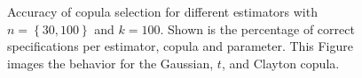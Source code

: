 \begin{figure}[t]
{	}
	\hfill
	\caption[\textsc{Accuracy of copula selection for different estimators / Gaussian, $t$ and Clayton copula}]{Accuracy of copula selection for different estimators with $ n = \left\lbrace 30,100 \right\rbrace $ and $k = 100$. Shown is the percentage of correct specifications per estimator, copula and parameter. This Figure images the behavior for the Gaussian, $t$, and Clayton copula.}
	\label{copSelect-gauss-t}
\end{figure}

